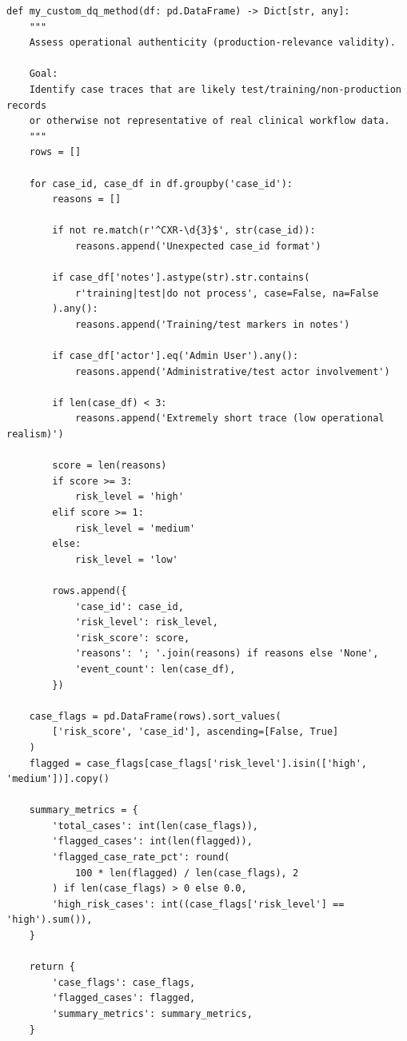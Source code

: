 \begin{lstlisting}[style=pycode,caption={Custom DQ assessment method from notebook Part 5 (operational authenticity)},label={lst:d5_custom_method}]
def my_custom_dq_method(df: pd.DataFrame) -> Dict[str, any]:
    """
    Assess operational authenticity (production-relevance validity).

    Goal:
    Identify case traces that are likely test/training/non-production records
    or otherwise not representative of real clinical workflow data.
    """
    rows = []

    for case_id, case_df in df.groupby('case_id'):
        reasons = []

        if not re.match(r'^CXR-\d{3}$', str(case_id)):
            reasons.append('Unexpected case_id format')

        if case_df['notes'].astype(str).str.contains(
            r'training|test|do not process', case=False, na=False
        ).any():
            reasons.append('Training/test markers in notes')

        if case_df['actor'].eq('Admin User').any():
            reasons.append('Administrative/test actor involvement')

        if len(case_df) < 3:
            reasons.append('Extremely short trace (low operational realism)')

        score = len(reasons)
        if score >= 3:
            risk_level = 'high'
        elif score >= 1:
            risk_level = 'medium'
        else:
            risk_level = 'low'

        rows.append({
            'case_id': case_id,
            'risk_level': risk_level,
            'risk_score': score,
            'reasons': '; '.join(reasons) if reasons else 'None',
            'event_count': len(case_df),
        })

    case_flags = pd.DataFrame(rows).sort_values(
        ['risk_score', 'case_id'], ascending=[False, True]
    )
    flagged = case_flags[case_flags['risk_level'].isin(['high', 'medium'])].copy()

    summary_metrics = {
        'total_cases': int(len(case_flags)),
        'flagged_cases': int(len(flagged)),
        'flagged_case_rate_pct': round(
            100 * len(flagged) / len(case_flags), 2
        ) if len(case_flags) > 0 else 0.0,
        'high_risk_cases': int((case_flags['risk_level'] == 'high').sum()),
    }

    return {
        'case_flags': case_flags,
        'flagged_cases': flagged,
        'summary_metrics': summary_metrics,
    }
\end{lstlisting}

